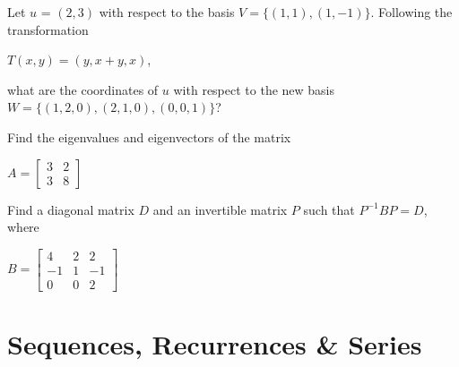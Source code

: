 \documentclass[12pt]{exam}
\begin{document}
\begin{questions}
\question Let \underline{$u$} = $(2,3)$ with respect to the basis $V = \{(1,1),(1,-1)\}$. Following the transformation

\begin{center}
    $T(x,y) = (y,x+y,x)$,
\end{center}

what are the coordinates of \underline{$u$} with respect to the new basis $W = \{(1,2,0),(2,1,0),(0,0,1)\}$?

\question Find the eigenvalues and eigenvectors of the matrix

\begin{center}
    $ A=   \begin{bmatrix}
3&2\\
3&8
    \end{bmatrix}$
\end{center}

\question Find a diagonal matrix $D$ and an invertible matrix $P$ such that $P^{-1}BP = D$, where

\begin{center}
$ B=
\begin{bmatrix}
4&2&2\\-1&1&-1\\0&0&2
\end{bmatrix}
$
\end{center}

\end{questions}

\section{Sequences, Recurrences \& Series}
\end{document}
